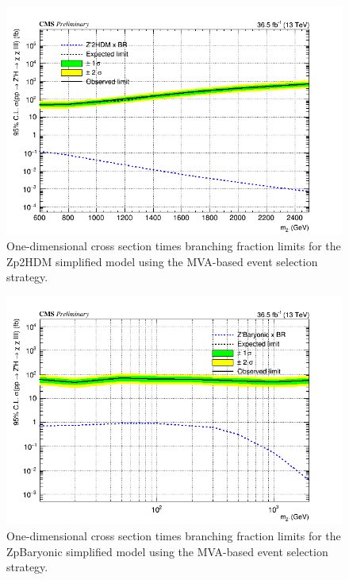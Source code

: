 \begin{figure}[tbh]
\centering
\includegraphics[width=5in]{figures/sigma_limits_4mu_Zp2HDM_MVA.png}
\caption{One-dimensional cross section times branching fraction limits for the Zp2HDM simplified model using the MVA-based event selection strategy.}
\label{fig:limzp2hdmmva}
\end{figure}

\begin{figure}[tbh]
\centering
\includegraphics[width=5in]{figures/sigma_limits_4mu_ZpBaryonic_MVA.png}
\caption{One-dimensional cross section times branching fraction limits for the ZpBaryonic simplified model using the MVA-based event selection strategy.}
\label{fig:limzpbaryonicmva}
\end{figure}

